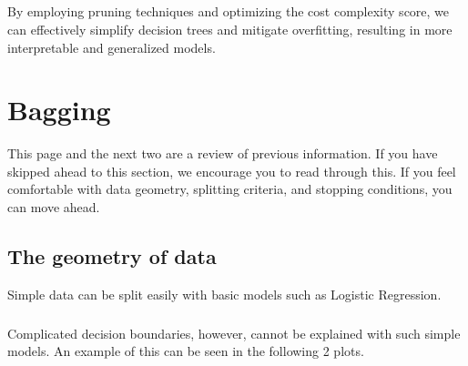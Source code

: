 \documentclass[11pt,a4paper]{report}
\begin{document}
\paragraph{}By employing pruning techniques and optimizing the cost complexity score, we can effectively simplify decision trees and mitigate overfitting, resulting in more interpretable and generalized models.\pagebreak
\chapter{Bagging}
This page and the next two are a review of previous information. If you have skipped ahead to this section, we encourage you to read through this. If you feel comfortable with data geometry, splitting criteria, and stopping conditions, you can move ahead.
\section{The geometry of data}Simple data can be split easily with basic models such as Logistic Regression.
\paragraph{}Complicated decision boundaries, however, cannot be explained with such simple models. An example of this can be seen in the following 2 plots.
\end{document}
